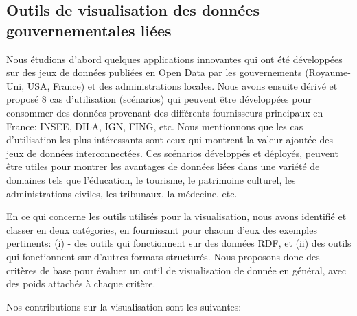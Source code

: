 \documentclass[a4paper,11pt,twoside]{report}
\begin{document}
\subsection*{Outils de visualisation des données gouvernementales liées} 
\label{visu}

Nous étudions d'abord quelques applications innovantes qui ont été développées sur des jeux de données publiées en Open Data par les gouvernements (Royaume-Uni, USA, France) et des administrations locales. Nous avons ensuite dérivé et proposé 8 cas d'utilisation (scénarios) qui peuvent être développées pour consommer des données provenant des différents fournisseurs principaux en France: INSEE, DILA, IGN, FING, etc. Nous mentionnons que les cas d'utilisation les plus intéressants sont ceux qui montrent la valeur ajoutée des jeux de données interconnectées. Ces scénarios développés et déployés, peuvent être utiles pour montrer les avantages de données liées dans une variété de domaines tels que l'éducation, le tourisme, le patrimoine culturel, les administrations civiles, les tribunaux, la médecine, etc.


En ce qui concerne les outils utilisés pour la visualisation, nous avons identifié et classer en deux catégories, en fournissant pour chacun d'eux des exemples pertinents: (i) - des outils qui fonctionnent sur des données RDF, et (ii) des outils qui fonctionnent sur d'autres formats structurés. Nous proposons donc des critères de base pour évaluer un outil de visualisation de donnée en général, avec des poids attachés à chaque critère.

Nos contributions sur la visualisation sont les suivantes: 
\end{document}

